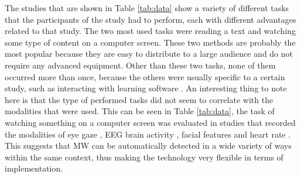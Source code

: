 The studies that are shown in Table \ref{tab:data} show a variety of different tasks that the participants of the study had to perform, each with different advantages related to that study. The two most used tasks were reading a text and watching some type of content on a computer screen. These two methods are probably the most popular because they are easy to distribute to a large audience and do not require any advanced equipment. Other than these two tasks, none of them occurred more than once, because the others were usually specific to a certain study, such as interacting with learning software \cite{Hutt2017OutClassroom}. An interesting thing to note here is that the type of performed tasks did not seem to correlate with the modalities that were used. This can be seen in Table \ref{tab:data}, the task of watching something on a computer screen was evaluated in studies that recorded the modalities of eye gaze \cite{Zhao2017ScalableApproach}, EEG brain activity \cite{Russell2016MonitoringEnvironments}, facial features \cite{Stewart2017FaceComprehension} and heart rate \cite{Pham2015Attentivelearner:Tracking}. This suggests that MW can be automatically detected in a wide variety of ways within the same context, thus making the technology very flexible in terms of implementation.